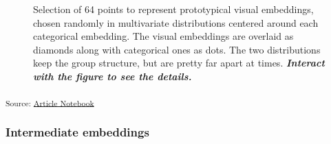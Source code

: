 \documentclass[
  authoryear]{elsarticle}
\begin{document}
\label{cell-fig-visual-embeddings}
\begin{figure}[H]


\caption{\label{fig-visual-embeddings}Selection of 64 points to
represent prototypical visual embeddings, chosen randomly in
multivariate distributions centered around each categorical embedding.
The visual embeddings are overlaid as diamonds along with categorical
ones as dots. The two distributions keep the group structure, but are
pretty far apart at times. \textbf{\emph{Interact with the figure to see
the details.}}}

\end{figure}%

\textsubscript{Source:
\href{https://m-delem.github.io/2499-similarity-manuscript/index.qmd.html}{Article
Notebook}}

\subsubsection{Intermediate embeddings}\label{intermediate-embeddings}
\end{document}
